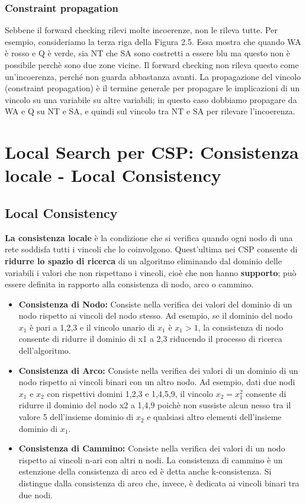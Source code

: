 \subsection{Constraint propagation}
Sebbene il forward checking rilevi molte incoerenze, non le rileva tutte. Per esempio, consideriamo la terza riga della Figura 2.5. Essa mostra che quando WA è rosso e Q è verde, sia NT che SA sono costretti a essere blu ma questo non è possibile perchè sono due zone vicine. Il forward checking non rileva questo come un’incoerenza, perché non guarda abbastanza avanti. La propagazione del vincolo (constraint propagation) è il termine generale per propagare le implicazioni di un vincolo su una variabile su altre variabili; in questo caso dobbiamo propagare da WA e Q su NT e SA, e quindi sul vincolo tra NT e SA per rilevare l’incoerenza.

\chapter{Local Search per CSP: Consistenza locale - Local Consistency} \label{ch:Local Search per Crisp CSP: Consistenza locale}
\section{Local Consistency}
\textbf{La consistenza locale} è la condizione che si verifica quando ogni nodo di una rete soddisfa tutti i vincoli che lo coinvolgono. Quest’ultima nei CSP consente di \textbf{ridurre lo spazio di ricerca} di un algoritmo eliminando dal dominio delle variabili i valori che non rispettano i vincoli, cioè che non hanno \textbf{supporto}; può essere definita in rapporto alla consistenza di nodo, arco o cammino.
\begin{itemize}
    \item \textbf{Consistenza di Nodo:} Consiste nella verifica dei valori del dominio di un nodo rispetto ai vincoli del nodo stesso. Ad esempio, se il dominio del nodo $x_1$ è pari a 1,2,3 e il vincolo unario di $x_1$ è $x_1 > 1$, la consistenza di nodo consente di ridurre il dominio di x1 a 2,3 riducendo il processo di ricerca dell’algoritmo.
    \item \textbf{Consistenza di Arco:} Consiste nella verifica dei valori di un dominio di un nodo rispetto ai vincoli binari con un altro nodo. Ad esempio, dati due nodi $x_1$ e $x_2$ con rispettivi domini 1,2,3 e 1,4,5,9, il vincolo $x_2 = x_{1}^2$ consente di ridurre il dominio del nodo x2 a 1,4,9 poichè non sussiste alcun nesso tra il valore 5 dell’insieme dominio di $x_2$ e qualsiasi altro elementi dell’insieme dominio di $x_1$.
    \item \textbf{Consistenza di Cammino:} Consiste nella verifica dei valori di un nodo rispetto ai vincoli n-ari con altri n nodi. La consistenza di cammino è un estenzione della consistenza di arco ed è detta anche k-consistenza. Si distingue dalla consistenza di arco che, invece, è dedicata ai vincoli binari tra due nodi.
\end{itemize}


